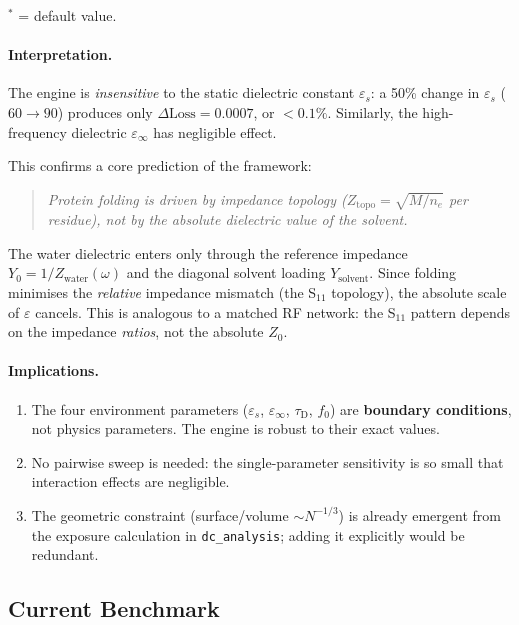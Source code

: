 \noindent${}^*$ = default value.

\paragraph{Interpretation.}
The engine is \emph{insensitive} to the static dielectric constant
$\varepsilon_s$: a 50\% change in $\varepsilon_s$ ($60 \to 90$)
produces only $\Delta\text{Loss} = 0.0007$, or $<0.1\%$.  Similarly,
the high-frequency dielectric $\varepsilon_\infty$ has negligible
effect.

This confirms a core prediction of the framework:
\begin{quote}
\emph{Protein folding is driven by impedance topology
($Z_\text{topo} = \sqrt{M/n_e}$ per residue), not by the
absolute dielectric value of the solvent.}
\end{quote}

The water dielectric enters only through the reference impedance
$Y_0 = 1/Z_\text{water}(\omega)$ and the diagonal solvent loading
$Y_\text{solvent}$.  Since folding minimises the \emph{relative}
impedance mismatch (the S$_{11}$ topology), the absolute scale
of $\varepsilon$ cancels.  This is analogous to a matched RF
network: the S$_{11}$ pattern depends on the impedance
\emph{ratios}, not the absolute $Z_0$.

\paragraph{Implications.}
\begin{enumerate}
\item The four environment parameters
      ($\varepsilon_s$, $\varepsilon_\infty$, $\tau_\text{D}$, $f_0$)
      are \textbf{boundary conditions}, not physics parameters.
      The engine is robust to their exact values.
\item No pairwise sweep is needed: the single-parameter sensitivity
      is so small that interaction effects are negligible.
\item The geometric constraint (surface/volume $\sim N^{-1/3}$)
      is already emergent from the exposure calculation in
      \texttt{dc\_analysis}; adding it explicitly would be redundant.
\end{enumerate}

\subsection{Current Benchmark}

